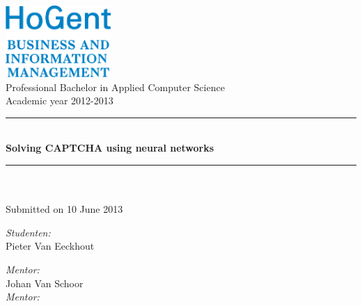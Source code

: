 \documentclass[pdftex,a4paper,12pt,twoside]{report}
\newcommand{\HRule}{\rule{\linewidth}{0.5mm}}
\theoremstyle{plain} \newtheorem{theorem}{Theorem} \newtheorem{proposition}{Proposition} \newtheorem{lemma}{Lemma} \newtheorem*{corollary}{Corollary}
\theoremstyle{definition} \newtheorem{definition}{Definition} \newtheorem{conjecture}{Conjecture} \newtheorem*{example}{Example} \newtheorem{algorithm}{Algorithm}
\theoremstyle{remark} \newtheorem*{remark}{Remark} \newtheorem*{note}{Note} \newtheorem{case}{Case}
\newcommand{\captchasp}{CAPTCHA }
\newcommand{\studenta}{Pieter {Van Eeckhout}}
\newcommand{\begeleider}{Johan {Van Schoor}}
\newcommand{\titel}{Solving \captchasp using neural networks}
\newcommand{\ondertitel}{}
\newcommand{\datum}{10 June 2013}
\newcommand{\academiejaar}{2012-2013}
\begin{document}

\begin{titlepage}
\begin{center}
\includegraphics[width=4cm]{./img/FBO-EN.png}\\[.5cm]




Professional Bachelor in Applied Computer Science\\
Academic year \academiejaar

\vfill

\HRule \\[0.4cm]
{ \huge \bfseries \titel}\\[0.4cm]
\HRule \\[0.4cm]

{\Large \ondertitel}\\[0.4cm]

Submitted on \datum

\vfill

\begin{minipage}{0.49\textwidth}
\begin{flushleft}
\emph{Student\ifdefined\studentb en\fi :}\\
\studenta \\
\ifdefined\studentb \studentb \fi\par
\end{flushleft}
\end{minipage}
\begin{minipage}{0.49\textwidth}
\begin{flushright}
\emph{Mentor:}\\ \begeleider\\
\ifdefined\mentor \emph{Mentor:}\\ \mentor \fi
\end{flushright}
\end{minipage}

\end{center}

\end{titlepage}

\end{document}
